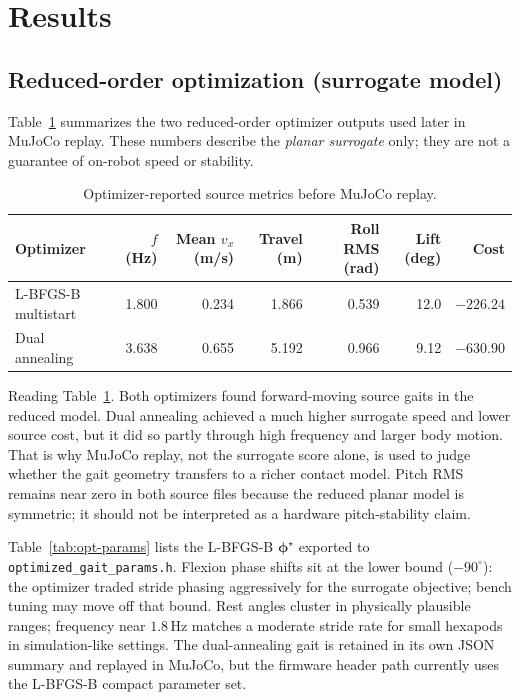 \documentclass[11pt]{article}
\begin{document}
\section{Results}
\label{sec:results}

\subsection{Reduced-order optimization (surrogate model)}
Table~\ref{tab:sim} summarizes the two reduced-order optimizer outputs used later in MuJoCo replay. These numbers describe the \emph{planar surrogate} only; they are not a guarantee of on-robot speed or stability.

\begin{table}[htbp]
  \centering
  \caption{Optimizer-reported source metrics before MuJoCo replay.}
  \label{tab:sim}
  \footnotesize
  \setlength{\tabcolsep}{5pt}
  \begin{tabular}{@{}lrrrrrr@{}}
    \toprule
    Optimizer & $f$ (Hz) & Mean $v_x$ (m/s) & Travel (m) & Roll RMS (rad) & Lift (deg) & Cost \\
    \midrule
    L-BFGS-B multistart & 1.800 & 0.234 & 1.866 & 0.539 & 12.0 & $-226.24$ \\
    Dual annealing & 3.638 & 0.655 & 5.192 & 0.966 & 9.12 & $-630.90$ \\
    \bottomrule
  \end{tabular}
\end{table}
\normalsize

Reading Table~\ref{tab:sim}. Both optimizers found forward-moving source gaits in the reduced model. Dual annealing achieved a much higher surrogate speed and lower source cost, but it did so partly through high frequency and larger body motion. That is why MuJoCo replay, not the surrogate score alone, is used to judge whether the gait geometry transfers to a richer contact model. Pitch RMS remains near zero in both source files because the reduced planar model is symmetric; it should not be interpreted as a hardware pitch-stability claim.

Table~\ref{tab:opt-params} lists the L-BFGS-B $\boldsymbol{\phi}^\star$ exported to \texttt{optimized\_gait\_params.h}. Flexion phase shifts sit at the lower bound ($-90^\circ$): the optimizer traded stride phasing aggressively for the surrogate objective; bench tuning may move off that bound. Rest angles cluster in physically plausible ranges; frequency near $1.8$\,Hz matches a moderate stride rate for small hexapods in simulation-like settings. The dual-annealing gait is retained in its own JSON summary and replayed in MuJoCo, but the firmware header path currently uses the L-BFGS-B compact parameter set.
\end{document}
